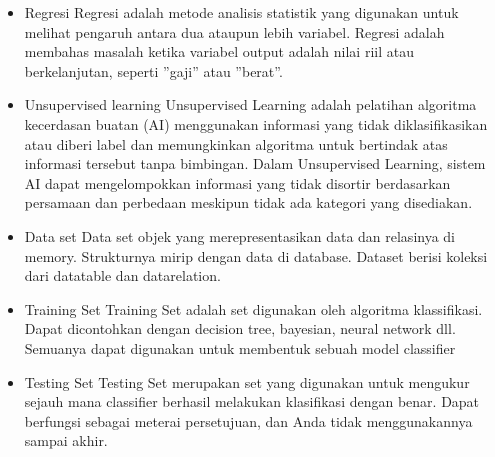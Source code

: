 \begin{enumerate}
\begin{itemize}
		\item Regresi
		\hfill\break
		Regresi adalah metode analisis statistik yang digunakan untuk melihat pengaruh antara dua ataupun lebih variabel. Regresi adalah membahas masalah ketika variabel output adalah nilai riil atau berkelanjutan, seperti ”gaji” atau ”berat”.
		\item Unsupervised learning 
		\hfill\break
		Unsupervised Learning adalah pelatihan algoritma kecerdasan buatan (AI) menggunakan informasi yang tidak diklasifikasikan atau diberi label dan memungkinkan algoritma untuk bertindak atas informasi tersebut tanpa bimbingan. Dalam Unsupervised Learning, sistem AI dapat mengelompokkan informasi yang tidak disortir berdasarkan persamaan dan perbedaan meskipun tidak ada kategori yang disediakan.
		\item Data set
		\hfill\break
		Data set objek yang merepresentasikan data dan relasinya di memory. Strukturnya mirip dengan data di database. Dataset berisi koleksi dari datatable dan datarelation.
		\item Training Set
		\hfill\break
		Training Set adalah set digunakan oleh algoritma klassifikasi. Dapat dicontohkan dengan decision tree, bayesian, neural network dll. Semuanya dapat digunakan untuk membentuk sebuah model classifier
		\item Testing Set
		\hfill\break
		Testing Set merupakan set yang digunakan untuk mengukur sejauh mana classifier berhasil melakukan klasifikasi dengan benar. Dapat berfungsi sebagai meterai persetujuan, dan Anda tidak menggunakannya sampai akhir.
	\end{itemize}
\end{enumerate}
